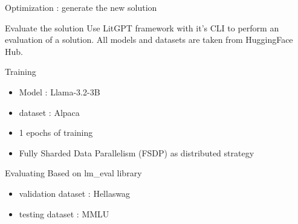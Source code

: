 \begin{frame}[allowframebreaks]{Optimization : generate the new solution}
        
\end{frame}



\begin{frame}{Evaluate the solution}
    Use LitGPT framework with it's CLI to perform an evaluation of a solution. All models and datasets are taken from HuggingFace Hub.
    \begin{block}{Training}
        \begin{itemize}
            \item Model : Llama-3.2-3B
            \item dataset : Alpaca
            \item 1 epochs of training
            \item Fully Sharded Data Parallelism (FSDP) as distributed strategy
        \end{itemize}
    \end{block}

    \begin{block}{Evaluating}
        Based on lm\_eval library
        \begin{itemize}
            \item validation dataset : Hellaswag
            \item testing dataset : MMLU
        \end{itemize}
    \end{block}

    
\end{frame}